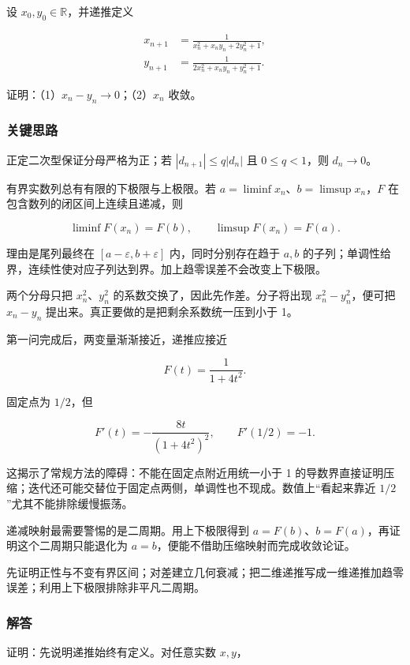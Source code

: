 \documentclass[11pt,a4paper]{article}
\begin{document}
设 \(x_0,y_0\in\mathbb R\)，并递推定义

\[
\begin{aligned}
x_{n+1}&=\frac1{x_n^2+x_ny_n+2y_n^2+1},\\
y_{n+1}&=\frac1{2x_n^2+x_ny_n+y_n^2+1}.
\end{aligned}
\]

证明：（1）\(x_n-y_n\to0\)；（2）\(x_n\) 收敛。

\subsubsection{关键思路}\label{ux5173ux952eux601dux8def-19}

正定二次型保证分母严格为正；若 \(|d_{n+1}|\le q|d_n|\) 且
\(0\le q<1\)，则 \(d_n\to0\)。

有界实数列总有有限的下极限与上极限。若
\(a=\liminf x_n\)、\(b=\limsup x_n\)，\(F\)
在包含数列的闭区间上连续且递减，则

\[
\liminf F(x_n)=F(b),\qquad
\limsup F(x_n)=F(a).
\]

理由是尾列最终在 \([a-\varepsilon,b+\varepsilon]\) 内，同时分别存在趋于
\(a,b\)
的子列；单调性给界，连续性使对应子列达到界。加上趋零误差不会改变上下极限。

两个分母只把 \(x_n^2\)、\(y_n^2\) 的系数交换了，因此先作差。分子将出现
\(x_n^2-y_n^2\)，便可把 \(x_n-y_n\)
提出来。真正要做的是把剩余系数统一压到小于 1。

第一问完成后，两变量渐渐接近，递推应接近

\[
F(t)=\frac1{1+4t^2}.
\]

固定点为 \(1/2\)，但

\[
F'(t)=-\frac{8t}{(1+4t^2)^2},\qquad F'(1/2)=-1.
\]

这揭示了常规方法的障碍：不能在固定点附近用统一小于 1
的导数界直接证明压缩；迭代还可能交替位于固定点两侧，单调性也不现成。数值上``看起来靠近
\(1/2\)''尤其不能排除缓慢振荡。

递减映射最需要警惕的是二周期。用上下极限得到
\(a=F(b)\)、\(b=F(a)\)，再证明这个二周期只能退化为
\(a=b\)，便能不借助压缩映射而完成收敛论证。

先证明正性与不变有界区间；对差建立几何衰减；把二维递推写成一维递推加趋零误差；利用上下极限排除非平凡二周期。

\subsubsection{解答}\label{ux89e3ux7b54-19}

证明：先说明递推始终有定义。对任意实数 \(x,y\)，
\end{document}
